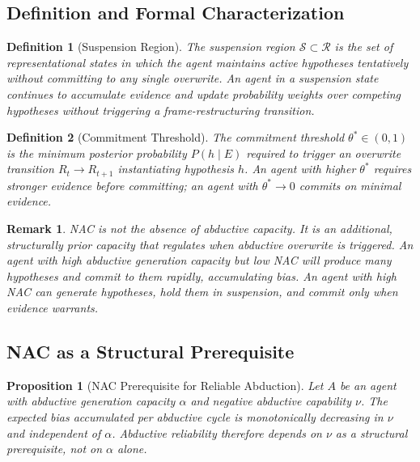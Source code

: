 \documentclass[12pt]{article}
\newtheorem{definition}{Definition}
\newtheorem{proposition}{Proposition}
\newtheorem{remark}{Remark}
\begin{document}
\subsection{Definition and Formal Characterization}

\begin{definition}[Suspension Region]
The suspension region $\mathcal{S} \subset \mathcal{R}$ is the set of
representational states in which the agent maintains active hypotheses
tentatively without committing to any single overwrite.
An agent in a suspension state continues to accumulate evidence and
update probability weights over competing hypotheses without triggering
a frame-restructuring transition.
\end{definition}

\begin{definition}[Commitment Threshold]
The commitment threshold $\theta^* \in (0,1)$ is the minimum posterior
probability $P(h \mid E)$ required to trigger an overwrite transition
$R_t \to R_{t+1}$ instantiating hypothesis $h$.
An agent with higher $\theta^*$ requires stronger evidence before
committing; an agent with $\theta^* \to 0$ commits on minimal evidence.
\end{definition}

\begin{remark}
NAC is not the absence of abductive capacity.
It is an additional, structurally prior capacity that regulates when
abductive overwrite is triggered.
An agent with high abductive generation capacity but low NAC will
produce many hypotheses and commit to them rapidly, accumulating bias.
An agent with high NAC can generate hypotheses, hold them in suspension,
and commit only when evidence warrants.
\end{remark}

\subsection{NAC as a Structural Prerequisite}

\begin{proposition}[NAC Prerequisite for Reliable Abduction]
Let $A$ be an agent with abductive generation capacity $\alpha$ and
negative abductive capability $\nu$.
The expected bias accumulated per abductive cycle is monotonically
decreasing in $\nu$ and independent of $\alpha$.
Abductive reliability therefore depends on $\nu$ as a structural
prerequisite, not on $\alpha$ alone.
\end{proposition}
\end{document}
